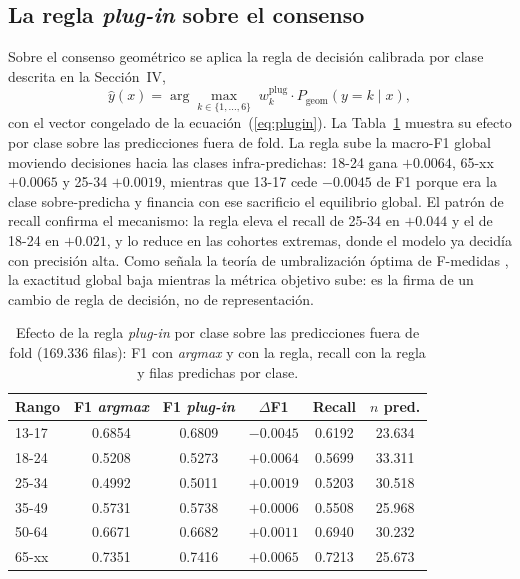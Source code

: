\documentclass[journal]{IEEEtai}
\begin{document}
\subsection{La regla \textit{plug-in} sobre el consenso}

Sobre el consenso geom\'etrico se aplica la regla de decisi\'on calibrada por clase descrita en la Secci\'on~IV,
\begin{equation}
\hat{y}(x) = \arg\max_{k \in \{1,\dots,6\}} \; w^{\text{plug}}_k \cdot P_{\text{geom}}(y = k \mid x),
\label{eq:decision}
\end{equation}
con el vector congelado de la ecuaci\'on~(\ref{eq:plugin}). La Tabla~\ref{tab:plugin} muestra su efecto por clase sobre las predicciones fuera de fold. La regla sube la macro-F1 global moviendo decisiones hacia las clases infra-predichas: 18-24 gana $+0.0064$, 65-xx $+0.0065$ y 25-34 $+0.0019$, mientras que 13-17 cede $-0.0045$ de F1 porque era la clase sobre-predicha y financia con ese sacrificio el equilibrio global. El patr\'on de recall confirma el mecanismo: la regla eleva el recall de 25-34 en $+0.044$ y el de 18-24 en $+0.021$, y lo reduce en las cohortes extremas, donde el modelo ya decid\'ia con precisi\'on alta. Como se\~nala la teor\'ia de umbralizaci\'on \'optima de F-medidas \cite{lipton2014,parambath2014,waegeman2014,narasimhan2015,eban2017}, la exactitud global baja mientras la m\'etrica objetivo sube: es la firma de un cambio de regla de decisi\'on, no de representaci\'on.

\begin{table}[htbp]
\centering
\caption{Efecto de la regla \textit{plug-in} por clase sobre las predicciones fuera de fold (169.336 filas): F1 con \textit{argmax} y con la regla, recall con la regla y filas predichas por clase.}
\label{tab:plugin}
\begin{tabular}{lccccc}
\toprule
Rango & F1 \textit{argmax} & F1 \textit{plug-in} & $\Delta$F1 & Recall & $n$ pred. \\
\midrule
13-17 & 0.6854 & 0.6809 & $-0.0045$ & 0.6192 & 23.634 \\
18-24 & 0.5208 & 0.5273 & $+0.0064$ & 0.5699 & 33.311 \\
25-34 & 0.4992 & 0.5011 & $+0.0019$ & 0.5203 & 30.518 \\
35-49 & 0.5731 & 0.5738 & $+0.0006$ & 0.5508 & 25.968 \\
50-64 & 0.6671 & 0.6682 & $+0.0011$ & 0.6940 & 30.232 \\
65-xx & 0.7351 & 0.7416 & $+0.0065$ & 0.7213 & 25.673 \\
\bottomrule
\end{tabular}
\end{table}
\end{document}
